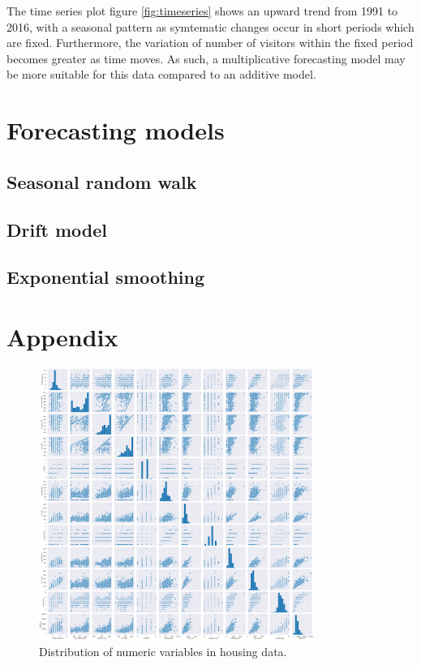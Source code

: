 \documentclass[letterpaper,12pt,twoside,]{pinp}
\begin{document}
The time series plot figure \ref{fig:timeseries} shows an upward trend
from 1991 to 2016, with a seasonal pattern as symtematic changes occur
in short periods which are fixed. Furthermore, the variation of number
of visitors within the fixed period becomes greater as time moves. As
such, a multiplicative forecasting model may be more suitable for this
data compared to an additive model.

\hypertarget{forecasting-models}{%
\section{Forecasting models}\label{forecasting-models}}

\hypertarget{seasonal-random-walk}{%
\subsection{Seasonal random walk}\label{seasonal-random-walk}}

\hypertarget{drift-model}{%
\subsection{Drift model}\label{drift-model}}

\hypertarget{exponential-smoothing}{%
\subsection{Exponential smoothing}\label{exponential-smoothing}}

\hypertarget{appendix}{%
\section{Appendix}\label{appendix}}

\begin{figure}
\includegraphics[width=0.8\textwidth]{scatter.png}
\centering
\caption{Distribution of numeric variables in housing data.}
\label{fig:scatter}
\end{figure}
\end{document}
